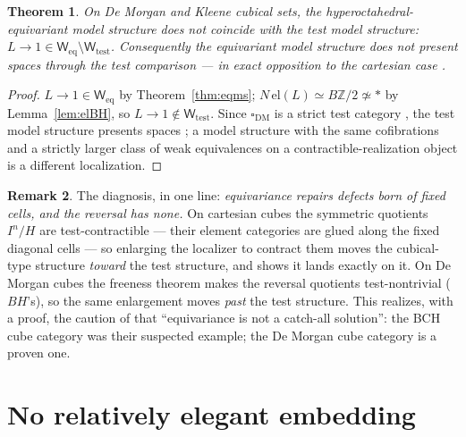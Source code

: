 \documentclass[11pt]{amsart}
\newtheorem{thm}{Theorem}[section]
\theoremstyle{definition}
\newtheorem{rem}[thm]{Remark}
\newcommand{\cube}{\square_{\mathrm{DM}}}
\newcommand{\el}{\mathrm{el}}
\newcommand{\Ldash}{L}
\newcommand{\Weq}{\mathsf{W}_{\mathrm{eq}}}
\newcommand{\Wtest}{\mathsf{W}_{\mathrm{test}}}
\begin{document}
\begin{thm}
  \label{thm:overshoot}
  On De Morgan and Kleene cubical sets, the
  hyperoctahedral-equivariant model structure does not coincide
  with the test model structure:
  $\Ldash \to 1 \in \Weq \setminus \Wtest$.  Consequently the
  equivariant model structure does not present spaces through the
  test comparison --- in exact opposition to the cartesian case
  \cite[Thm.~6.3.6]{ACCRS}.
\end{thm}

\begin{proof}
  $\Ldash \to 1 \in \Weq$ by Theorem~\ref{thm:eqms};
  $N\,\el(\Ldash) \simeq B\mathbb{Z}/2 \not\simeq *$ by
  Lemma~\ref{lem:elBH}, so $\Ldash \to 1 \notin \Wtest$.  Since
  $\cube$ is a strict test category \cite{BuchholtzMorehouse}, the
  test model structure presents spaces \cite{Cisinski}; a model
  structure with the same cofibrations and a strictly larger class
  of weak equivalences on a contractible-realization object is a
  different localization.
\end{proof}

\begin{rem}
  The diagnosis, in one line: \emph{equivariance repairs defects
  born of fixed cells, and the reversal has none.}  On cartesian
  cubes the symmetric quotients $I^n/H$ are test-contractible ---
  their element categories are glued along the fixed diagonal
  cells --- so enlarging the localizer to contract them moves the
  cubical-type structure \emph{toward} the test structure, and
  \cite{ACCRS} shows it lands exactly on it.  On De Morgan cubes
  the freeness theorem makes the reversal quotients test-nontrivial
  ($BH$'s), so the same enlargement moves \emph{past} the test
  structure.  This realizes, with a proof, the caution of
  \cite[§1.7.2]{ACCRS} that ``equivariance is not a catch-all
  solution'': the BCH cube category was their suspected example;
  the De Morgan cube category is a proven one.
\end{rem}

\section{No relatively elegant embedding}
\label{sec:crown}
\end{document}
